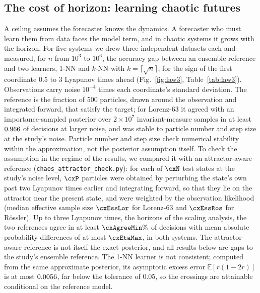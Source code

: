 \documentclass[journal]{IEEEtran}
\theoremstyle{definition}
\newcommand{\E}{\mathbb{E}}
\begin{document}
\subsection{The cost of horizon: learning chaotic futures}\label{sec:res-chaos}
A ceiling assumes the forecaster knows the dynamics. A forecaster who must learn them from data faces the model term, and in chaotic systems it grows with the horizon. For five systems we drew three independent datasets each and measured, for $n$ from $10^3$ to $10^6$, the accuracy gap between an ensemble reference and two learners, 1-NN and $k$-NN with $k=\lceil\sqrt n\rceil$, for the sign of the first coordinate $0.5$ to $3$ Lyapunov times ahead (Fig.~\ref{fig:law3}, Table~\ref{tab:law3}). Observations carry noise $10^{-4}$ times each coordinate's standard deviation. The reference is the fraction of 500 particles, drawn around the observation and integrated forward, that satisfy the target; for Lorenz-63 it agreed with an importance-sampled posterior over $2\times10^7$ invariant-measure samples in at least $0.966$ of decisions at larger noise, and was stable to particle number and step size at the study's noise. Particle number and step size check numerical stability within the approximation, not the posterior assumption itself. To check the assumption in the regime of the results, we compared it with an attractor-aware reference (\texttt{chaos\_attractor\_check.py}): for each of $\cxN$ test states at the study's noise level, $\cxP$ particles were obtained by perturbing the state's own past two Lyapunov times earlier and integrating forward, so that they lie on the attractor near the present state, and were weighted by the observation likelihood (median effective sample size $\cxEssLor$ for Lorenz-63 and $\cxEssRos$ for R\"ossler). Up to three Lyapunov times, the horizons of the scaling analysis, the two references agree in at least $\cxAgreeMin\%$ of decisions with mean absolute probability differences of at most $\cxEtaMax$, in both systems. The attractor-aware reference is not itself the exact posterior, and all results below are gaps to the study's ensemble reference. The 1-NN learner is not consistent; computed from the same approximate posterior, its asymptotic excess error $\E[r(1-2r)]$ is at most $0.0056$, far below the tolerance of $0.05$, so the crossings are attainable conditional on the reference model.
\end{document}
